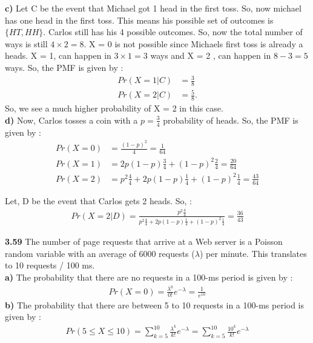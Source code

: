 \documentclass{article}
\begin{document}
{\bf c)} Let C be the event that Michael got 1 head in the first toss. So, now michael has one head in the first toss. This means his possible set of outcomes is $\{HT,HH\}$. Carlos still has his 4 possible outcomes. So, now the total number of ways is still $4 \times 2 = 8$. X = 0 is not possible since Michaels first toss is already a heads. X = 1, can happen in $3 \times 1 = 3$ ways and X = 2 , can happen in $8 -  3 = 5$ ways. So, the PMF is given by :
\begin{align*}
Pr ( X = 1 | C) &= \frac{3}{8} \\
Pr ( X = 2 | C) &= \frac{5}{8}. 
\end{align*} 
So, we see a much higher probability of X = 2 in this case. \\

{\bf d)} Now, Carlos tosses a coin with a $p=\frac{3}{4}$ probability of heads. So, the PMF is given by : 
\begin{align*}
Pr ( X = 0 ) &= \frac{(1-p)^2}{4} = \frac{1}{64} \\
Pr ( X = 1 ) &= 2p(1-p) \frac{3}{4} + (1-p)^2 \frac{2}{4} = \frac{20}{64} \\
Pr ( X = 2 ) &= p^2 \frac{4}{4} + 2p(1-p)\frac{1}{4} +  (1-p)^2 \frac{1}{4} = \frac{43}{64}
\end{align*}

Let, D be the event that Carlos gets 2 heads. So, : 
\begin{align*}
Pr ( X = 2 | D) = \frac{p^2 \frac{4}{4}}{p^2 \frac{4}{4} + 2p(1-p)\frac{1}{4} +  (1-p)^2 \frac{1}{4}} = \frac{36}{43}
\end{align*}

\vspace{5 mm}

{\bf 3.59 } The number of page requests that arrive at a Web server is a Poisson random variable
with an average of 6000 requests ($\lambda $) per minute. This translates to 10 requests / 100 ms. \\

{\bf a)} The probability that there are no requests in a 100-ms period is given by : 
\begin{align*}
Pr (X=0) = \frac{\lambda^0}{0!} e^{-\lambda} = \frac{1}{e^{10}}
\end{align*}
\vspace{2 mm}
{\bf b)} The probability that there are between 5 to 10 requests in a 100-ms period is given by :
\begin{align*}
Pr (5 \leq X \leq 10) = \sum_{k = 5}^{10} \frac{\lambda^k}{k!} e^{-\lambda} = \sum_{k = 5}^{10} \frac{10^k}{k!} e^{-\lambda}
\end{align*}
\end{document}
